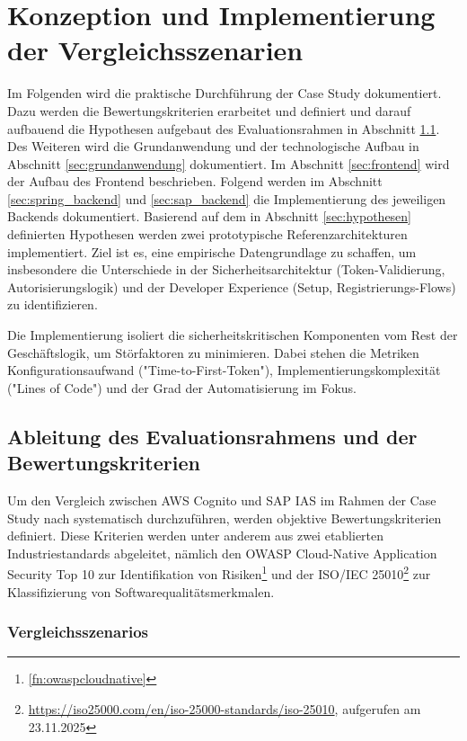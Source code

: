 
\chapter{Konzeption und Implementierung der Vergleichsszenarien}
\label{ch:implementierung}

Im Folgenden wird die praktische Durchführung der Case Study dokumentiert. Dazu werden die Bewertungskriterien erarbeitet und definiert und darauf aufbauend die Hypothesen aufgebaut des Evaluationsrahmen in Abschnitt \ref{sec:evaluationsrahmen}. Des Weiteren wird die Grundanwendung und der technologische Aufbau in Abschnitt \ref{sec:grundanwendung} dokumentiert. Im Abschnitt \ref{sec:frontend} wird der Aufbau des Frontend beschrieben. Folgend werden im Abschnitt \ref{sec:spring_backend} und \ref{sec:sap_backend} die Implementierung des jeweiligen Backends dokumentiert.
\newline
Basierend auf dem in Abschnitt \ref{sec:hypothesen} definierten Hypothesen werden zwei prototypische Referenzarchitekturen implementiert. Ziel ist es, eine empirische Datengrundlage zu schaffen, um insbesondere die Unterschiede in der Sicherheitsarchitektur (Token-Validierung, Autorisierungslogik) und der Developer Experience (Setup, Registrierungs-Flows) zu identifizieren.

Die Implementierung isoliert die sicherheitskritischen Komponenten vom Rest der Geschäftslogik, um Störfaktoren zu minimieren. Dabei stehen die Metriken Konfigurationsaufwand ("Time-to-First-Token"), Implementierungskomplexität ("Lines of Code") und der Grad der Automatisierung im Fokus.


\section{Ableitung des Evaluationsrahmens und der Bewertungskriterien}
\label{sec:evaluationsrahmen}

Um den Vergleich zwischen \ac{AWS} Cognito und \ac{SAP IAS} im Rahmen der Case Study nach \citep{Kitchenham1995} systematisch durchzuführen, werden objektive Bewertungskriterien definiert. Diese Kriterien werden unter anderem aus zwei etablierten Industriestandards abgeleitet, nämlich den \ac{OWASP} Cloud-Native Application Security Top 10 zur Identifikation von Risiken\footnote{\ref{fn:owaspcloudnative}} und der ISO/IEC 25010\footnote{\url{https://iso25000.com/en/iso-25000-standards/iso-25010}, aufgerufen am 23.11.2025} zur Klassifizierung von Softwarequalitätsmerkmalen.

\subsection{Vergleichsszenarios}

